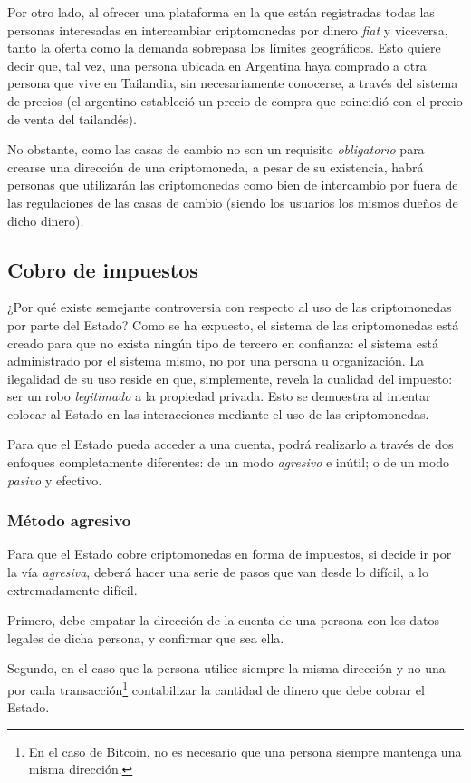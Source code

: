 \documentclass[12pt,a4paper,twoside]{book}
\begin{document}
Por otro lado, al ofrecer una plataforma en la que están registradas todas las personas interesadas en intercambiar criptomonedas por dinero \textit{fiat} y viceversa, tanto la oferta como la demanda sobrepasa los límites geográficos. Esto quiere decir que, tal vez, una persona ubicada en Argentina haya comprado a otra persona que vive en Tailandia, sin necesariamente conocerse, a través del sistema de precios (el argentino estableció un precio de compra que coincidió con el precio de venta del tailandés).

No obstante, como las casas de cambio no son un requisito \textit{obligatorio} para crearse una dirección de una criptomoneda, a pesar de su existencia, habrá personas que utilizarán las criptomonedas como bien de intercambio por fuera de las regulaciones de las casas de cambio (siendo los usuarios los mismos dueños de dicho dinero).

\subsection{Cobro de impuestos}
¿Por qué existe semejante controversia con respecto al uso de las criptomonedas por parte del Estado? Como se ha expuesto, el sistema de las criptomonedas está creado para que no exista ningún tipo de tercero en confianza: el sistema está administrado por el sistema mismo, no por una persona u organización. La ilegalidad de su uso reside en que, simplemente, revela la cualidad del impuesto: ser un robo \textit{legitimado} a la propiedad privada. Esto se demuestra al intentar colocar al Estado en las interacciones mediante el uso de las criptomonedas.	

Para que el Estado pueda acceder a una cuenta, podrá realizarlo a través de dos enfoques completamente diferentes: de un modo \textit{agresivo} e inútil; o de un modo \textit{pasivo} y efectivo.

\subsubsection{Método agresivo}
Para que el Estado cobre criptomonedas en forma de impuestos, si decide ir por la vía \textit{agresiva}, deberá hacer una serie de pasos que van desde lo difícil, a lo extremadamente difícil.

Primero, debe empatar la dirección de la cuenta de una persona con los datos legales de dicha persona, y confirmar que sea ella.

Segundo, en el caso que la persona utilice siempre la misma dirección y no una por cada transacción\footnote{En el caso de Bitcoin, no es necesario que una persona siempre mantenga una misma dirección.} contabilizar la cantidad de dinero que debe cobrar el Estado.
\end{document}
